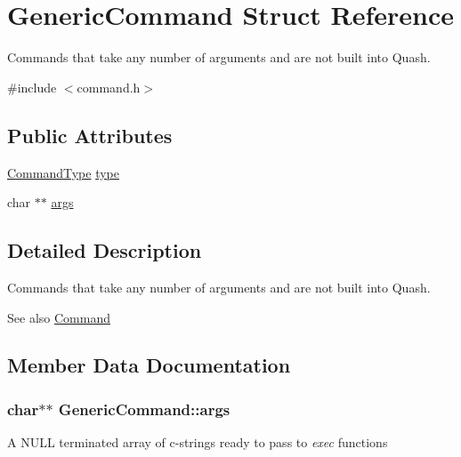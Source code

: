 \hypertarget{structGenericCommand}{}\section{Generic\+Command Struct Reference}
\label{structGenericCommand}


Commands that take any number of arguments and are not built into Quash.  




{\ttfamily \#include $<$command.\+h$>$}

\subsection*{Public Attributes}
\begin{DoxyCompactItemize}
\item 
\hyperlink{command_8h_a21e038f5b8958e203d28bc4f18472352}{Command\+Type} \hyperlink{structGenericCommand_af50a1b4b5724e01b97f4755627de108e}{type}
\item 
char $\ast$$\ast$ \hyperlink{structGenericCommand_a0f2219278396d334144d424c02fd6389}{args}
\end{DoxyCompactItemize}


\subsection{Detailed Description}
Commands that take any number of arguments and are not built into Quash. 

\begin{DoxySeeAlso}{See also}
\hyperlink{unionCommand}{Command} 
\end{DoxySeeAlso}


\subsection{Member Data Documentation}
\subsubsection[{\texorpdfstring{args}{args}}]{\setlength{\rightskip}{0pt plus 5cm}char$\ast$$\ast$ Generic\+Command\+::args}\hypertarget{structGenericCommand_a0f2219278396d334144d424c02fd6389}{}\label{structGenericCommand_a0f2219278396d334144d424c02fd6389}
A N\+U\+LL terminated array of c-\/strings ready to pass to {\itshape exec} functions 
